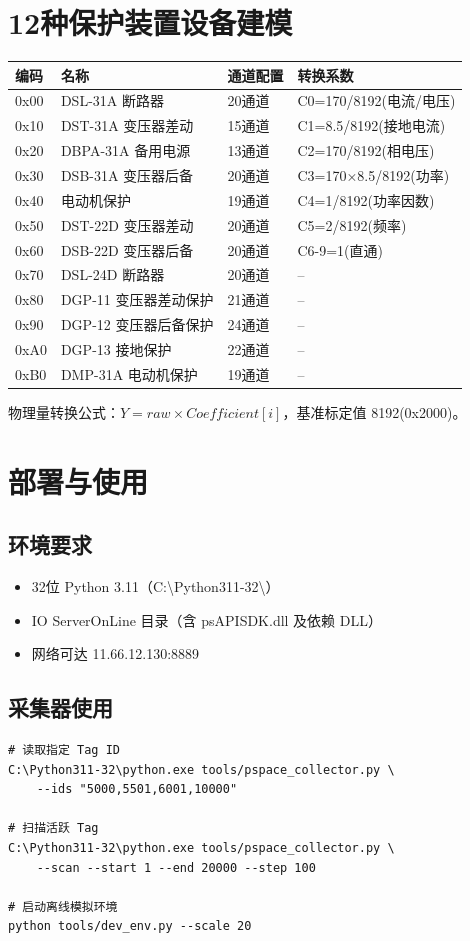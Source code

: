 \documentclass[12pt,a4paper]{ctexart}
\begin{document}
\section{12种保护装置设备建模}
\begin{longtable}{lp{2.5cm}p{4cm}p{3cm}}
\toprule
\textbf{编码} & \textbf{名称} & \textbf{通道配置} & \textbf{转换系数} \\
\midrule
0x00 & DSL-31A 断路器 & 20通道 & C0=170/8192(电流/电压) \\
0x10 & DST-31A 变压器差动 & 15通道 & C1=8.5/8192(接地电流) \\
0x20 & DBPA-31A 备用电源 & 13通道 & C2=170/8192(相电压) \\
0x30 & DSB-31A 变压器后备 & 20通道 & C3=170×8.5/8192(功率) \\
0x40 & 电动机保护 & 19通道 & C4=1/8192(功率因数) \\
0x50 & DST-22D 变压器差动 & 20通道 & C5=2/8192(频率) \\
0x60 & DSB-22D 变压器后备 & 20通道 & C6-9=1(直通) \\
0x70 & DSL-24D 断路器 & 20通道 & -- \\
0x80 & DGP-11 变压器差动保护 & 21通道 & -- \\
0x90 & DGP-12 变压器后备保护 & 24通道 & -- \\
0xA0 & DGP-13 接地保护 & 22通道 & -- \\
0xB0 & DMP-31A 电动机保护 & 19通道 & -- \\
\bottomrule
\end{longtable}

物理量转换公式：$Y = raw \times Coefficient[i]$，基准标定值 8192(0x2000)。

\section{部署与使用}

\subsection{环境要求}
\begin{itemize}[leftmargin=*]
  \item 32位 Python 3.11（C:\textbackslash Python311-32\textbackslash）
  \item IO ServerOnLine 目录（含 psAPISDK.dll 及依赖 DLL）
  \item 网络可达 11.66.12.130:8889
\end{itemize}

\subsection{采集器使用}
\begin{verbatim}
# 读取指定 Tag ID
C:\Python311-32\python.exe tools/pspace_collector.py \
    --ids "5000,5501,6001,10000"

# 扫描活跃 Tag
C:\Python311-32\python.exe tools/pspace_collector.py \
    --scan --start 1 --end 20000 --step 100

# 启动离线模拟环境
python tools/dev_env.py --scale 20
\end{verbatim}
\end{document}
